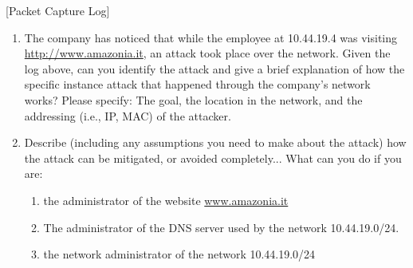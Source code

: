 \documentclass{article}
\begin{document}
[Packet Capture Log]

\begin{enumerate}
    \item[\textbf{1.}] [3 points] The company has noticed that while the employee at 10.44.19.4 was visiting \url{http://www.amazonia.it}, an attack took place over the network. Given the log above, can you identify the attack and give a brief explanation of how the specific instance attack that happened through the company's network works? Please specify: The goal, the location in the network, and the addressing (i.e., IP, MAC) of the attacker.
    \item[\textbf{2.}] [3 points] Describe (including any assumptions you need to make about the attack) how the attack can be mitigated, or avoided completely... What can you do if you are:
    \begin{enumerate}
        \item[\textbf{a)}] the administrator of the website \url{www.amazonia.it}
        \item[\textbf{b)}] The administrator of the DNS server used by the network 10.44.19.0/24.
        \item[\textbf{c)}] the network administrator of the network 10.44.19.0/24
    \end{enumerate}
\end{enumerate}
\end{document}
